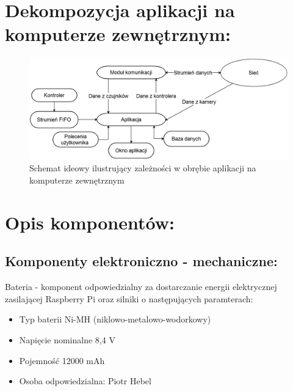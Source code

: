 \documentclass[a4paper]{article}
\begin{document}
\section{Dekompozycja aplikacji na komputerze zewnętrznym:}
\begin{figure}[H]
    \centering
    \includegraphics[width=15cm]{gui}
    \caption{Schemat ideowy ilustrujący zależności w obrębie aplikacji na komputerze zewnętrznym}
    \label{fig:my_label}
\end{figure}

\section{Opis komponentów:}

\subsection{Komponenty elektroniczno - mechaniczne:}


Bateria - komponent odpowiedzialny za dostarczanie energii elektrycznej zasilającej Raspberry Pi oraz silniki o następujących paramterach:
\begin{itemize}
\item Typ baterii Ni-MH (niklowo-metalowo-wodorkowy)
\item Napięcie nominalne 8,4 V
\item Pojemność 12000 mAh
\item Osoba odpowiedzialna: Piotr Hebel
\end{itemize}
\end{document}
